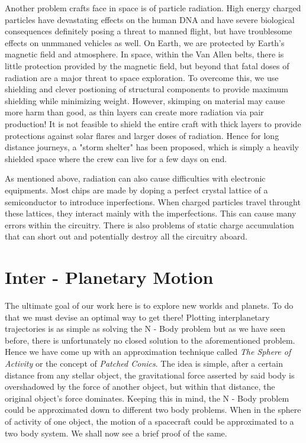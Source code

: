 \documentclass[12pt, letterpaper]{article}
\begin{document}
Another problem crafts face in space is of particle radiation. High energy charged particles have devastating effects on the human DNA and have severe biological consequences definitely posing a threat to manned flight, but have troublesome effects on unmmaned vehicles as well. On Earth, we are protected by Earth's magnetic field and atmosphere. In space, within the Van Allen belts, there is little protection provided by the magnetic field, but beyond that fatal doses of radiation are a major threat to space exploration. To overcome this, we use shielding and clever postioning of structural components to provide maximum shielding while minimizing weight. However, skimping on material may cause more harm than good, as thin layers can create more radiation via pair production! It is not feasible to shield the entire craft with thick layers to provide protections against solar flares and larger doses of radiation. Hence for long distance journeys, a "storm shelter" has been proposed, which is simply a heavily shielded space where the crew can live for a few days on end. 

As mentioned above, radiation can also cause difficulties with electronic equipments. Most chips are made by doping a perfect crystal lattice of a semiconductor to introduce inperfections. When charged particles travel throught these lattices, they interact mainly with the imperfections. This can cause many errors within the circuitry. There is also problems of static charge accumulation that can short out and potentially destroy all the circuitry aboard.

\newpage
\section{Inter - Planetary Motion}

The ultimate goal of our work here is to explore new worlds and planets. To do that we must devise an optimal way to get there! Plotting interplanetary trajectories is as simple as solving the N - Body problem but as we have seen before, there is unfortunately no closed solution to the aforementioned problem. Hence we have come up with an approximation technique called \textit{The Sphere of Activity} or the concept of \textit{Patched Conics}. The idea is simple, after a certain distance from any stellar object, the gravitational force asserted by said body is overshadowed by the force of another object, but within that distance, the original object's force dominates. Keeping this in mind, the N - Body problem could be approximated down to different two body problems. When in the sphere of activity of one object, the motion of a spacecraft could be approximated to a two body system. We shall now see a brief proof of the same.
\end{document}
